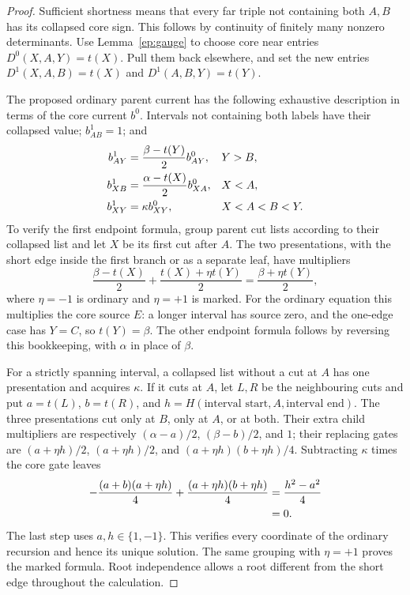 \documentclass[11pt,letterpaper]{article}
\numberwithin{equation}{section}
\theoremstyle{definition}
\theoremstyle{remark}
\begin{document}
\begin{proof}
Sufficient shortness means that every far triple not containing both
$A,B$ has its collapsed core sign.  This follows by continuity of finitely
many nonzero determinants.  Use Lemma~\ref{ep:gauge} to choose core near
entries $D^0(X,A,Y)=t(X)$.  Pull them back elsewhere, and set the new
entries $D^1(X,A,B)=t(X)$ and $D^1(A,B,Y)=t(Y)$.

The proposed ordinary parent current has the following exhaustive
description in terms of the core current $b^0$.  Intervals not containing
both labels have their collapsed value; $b^1_{AB}=1$; and
\begin{align}
 b^1_{AY}&=\frac{\beta-t(Y)}2 b^0_{AY}, &&Y>B,\notag\\
 b^1_{XB}&=\frac{\alpha-t(X)}2 b^0_{XA}, &&X<A,\notag\\
 b^1_{XY}&=\kappa b^0_{XY}, &&X<A<B<Y.
 \label{ep:duplicate-current-table}
\end{align}
To verify the first endpoint formula, group parent cut lists according to
their collapsed list and let $X$ be its first cut after $A$.  The two
presentations, with the short edge inside the first branch or as a separate
leaf, have multipliers
\begin{equation}
 \frac{\beta-t(X)}2+\frac{t(X)+\eta t(Y)}2
 =\frac{\beta+\eta t(Y)}2,
 \label{ep:endpoint-two-lifts}
\end{equation}
where $\eta=-1$ is ordinary and $\eta=+1$ is marked.  For the ordinary
equation this multiplies the core source $E$: a longer interval has source
zero, and the one-edge case has $Y=C$, so $t(Y)=\beta$.  The other endpoint
formula follows by reversing this bookkeeping, with $\alpha$ in place of
$\beta$.

For a strictly spanning interval, a collapsed list without a cut at $A$
has one presentation and acquires $\kappa$.  If it cuts at $A$, let $L,R$
be the neighbouring cuts and put $a=t(L)$, $b=t(R)$, and
$h=H(\text{interval start},A,\text{interval end})$.  The three
presentations cut only at $B$, only at $A$, or at both.  Their extra child
multipliers are respectively $(\alpha-a)/2$, $(\beta-b)/2$, and $1$;
their replacing gates are $(a+\eta h)/2$, $(a+\eta h)/2$, and
$(a+\eta h)(b+\eta h)/4$.  Subtracting $\kappa$ times the core gate
leaves
\begin{align}
 -\frac{(a+b)(a+\eta h)}4
 +\frac{(a+\eta h)(b+\eta h)}4
 &=\frac{h^2-a^2}{4}\notag\\
 &=0.
 \label{ep:three-lifts}
\end{align}
The last step uses $a,h\in\{1,-1\}$.  This verifies every coordinate of
the ordinary recursion and hence its unique solution.  The same grouping
with $\eta=+1$ proves the marked formula.  Root independence allows a root
different from the short edge throughout the calculation.
\end{proof}
\end{document}
